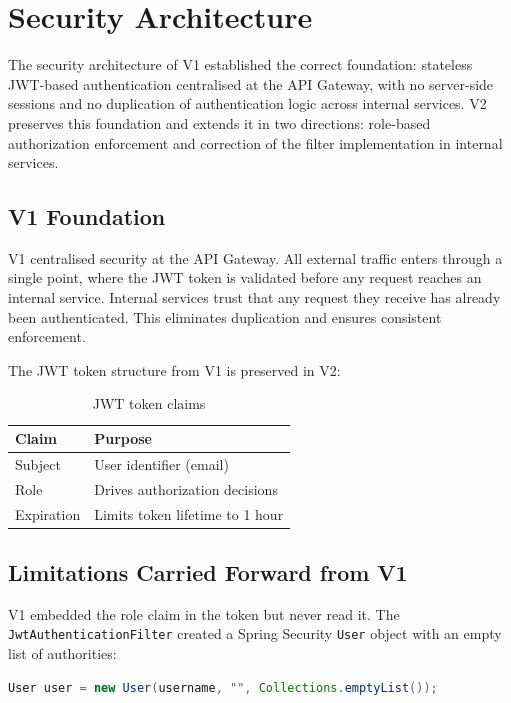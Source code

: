 \section{Security Architecture}

The security architecture of V1 established the correct foundation: stateless JWT-based authentication centralised at the API Gateway, with no server-side sessions and no duplication of authentication logic across internal services. V2 preserves this foundation and extends it in two directions: role-based authorization enforcement and correction of the filter implementation in internal services.

\subsection{V1 Foundation}

V1 centralised security at the API Gateway. All external traffic enters through a single point, where the JWT token is validated before any request reaches an internal service. Internal services trust that any request they receive has already been authenticated. This eliminates duplication and ensures consistent enforcement.

The JWT token structure from V1 is preserved in V2:

\begin{table}[H]
\centering
\begin{tabular}{ll}
\toprule
\textbf{Claim} & \textbf{Purpose} \\
\midrule
Subject & User identifier (email) \\
Role & Drives authorization decisions \\
Expiration & Limits token lifetime to 1 hour \\
\bottomrule
\end{tabular}
\caption{JWT token claims}
\end{table}

\subsection{Limitations Carried Forward from V1}

V1 embedded the role claim in the token but never read it. The \texttt{JwtAuthenticationFilter} created a Spring Security \texttt{User} object with an empty list of authorities:

\begin{lstlisting}[style=javastyle, language=Java, caption={V1 — role claim ignored}]
User user = new User(username, "", Collections.emptyList());
\end{lstlisting}

